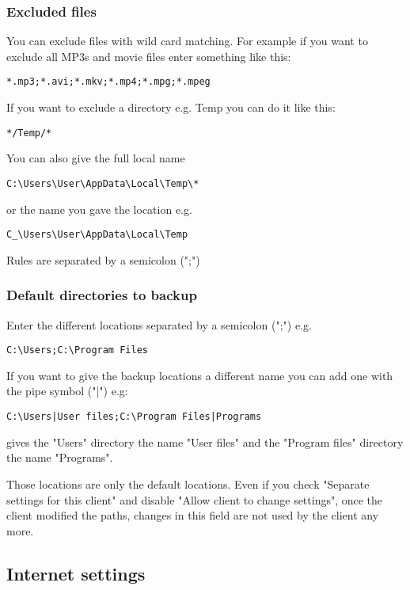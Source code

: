 \documentclass[a4paper,10pt]{article}
\begin{document}
\subsubsection{Excluded files}
\label{subsub_excluded_files}

You can exclude files with wild card matching. For example if you want to exclude all MP3s and movie files enter something like this:
\begin{verbatim}
*.mp3;*.avi;*.mkv;*.mp4;*.mpg;*.mpeg
\end{verbatim}
If you want to exclude a directory e.g. Temp you can do it like this:
\begin{verbatim}
*/Temp/*
\end{verbatim}
You can also give the full local name
\begin{verbatim}
C:\Users\User\AppData\Local\Temp\*
\end{verbatim}
or the name you gave the location e.g.
\begin{verbatim}
C_\Users\User\AppData\Local\Temp
\end{verbatim}

Rules are separated by a semicolon (";")

\subsubsection{Default directories to backup}
\label{subsub_default_dirs}

Enter the different locations separated by a semicolon (";") e.g.
\begin{verbatim}
C:\Users;C:\Program Files
\end{verbatim}
If you want to give the backup locations a different name you can add one with the pipe symbol ("|") e.g:
\begin{verbatim}
C:\Users|User files;C:\Program Files|Programs
\end{verbatim}
gives the "Users" directory the name "User files" and the "Program files" directory the name "Programs".

Those locations are only the default locations. Even if you check "Separate settings for this client" and disable "Allow client to change settings", once the client modified the paths, changes in this field are not used by the client any more.

\subsection{Internet settings}
\end{document}
